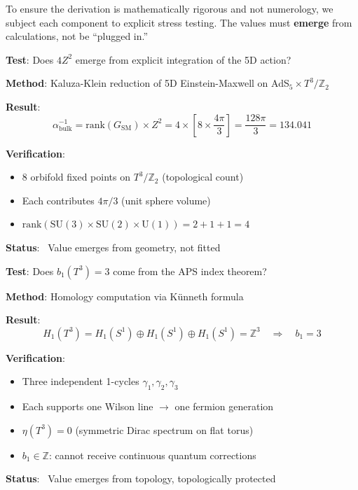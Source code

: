 \documentclass[12pt,a4paper]{article}
\newcommand{\Ztwo}{\mathbb{Z}_2}
\newcommand{\Tthree}{T^3}
\newcommand{\Zsq}{Z^2}
\begin{document}
To ensure the derivation is mathematically rigorous and not numerology, we subject each component to explicit stress testing. The values must \textbf{emerge} from calculations, not be ``plugged in.''

\begin{tcolorbox}[colback=blue!5!white, colframe=blue!60!black, title=Audit 1: Bulk Calculus (134.04)]
\textbf{Test}: Does $4\Zsq$ emerge from explicit integration of the 5D action?

\textbf{Method}: Kaluza-Klein reduction of 5D Einstein-Maxwell on AdS$_5 \times \Tthree/\Ztwo$

\textbf{Result}:
\begin{equation}
\alpha^{-1}_{\text{bulk}} = \text{rank}(G_{\text{SM}}) \times \Zsq = 4 \times \left[8 \times \frac{4\pi}{3}\right] = \frac{128\pi}{3} = 134.041
\end{equation}

\textbf{Verification}:
\begin{itemize}[itemsep=0pt]
    \item 8 orbifold fixed points on $\Tthree/\Ztwo$ (topological count)
    \item Each contributes $4\pi/3$ (unit sphere volume)
    \item $\text{rank}(\text{SU}(3) \times \text{SU}(2) \times \text{U}(1)) = 2 + 1 + 1 = 4$
\end{itemize}
\textbf{Status}: \checkmark\ Value emerges from geometry, not fitted
\end{tcolorbox}

\begin{tcolorbox}[colback=blue!5!white, colframe=blue!60!black, title=Audit 2: Topological Boundary (+3)]
\textbf{Test}: Does $b_1(\Tthree) = 3$ come from the APS index theorem?

\textbf{Method}: Homology computation via K\"unneth formula

\textbf{Result}:
\begin{equation}
H_1(\Tthree) = H_1(S^1) \oplus H_1(S^1) \oplus H_1(S^1) = \mathbb{Z}^3 \quad \Rightarrow \quad b_1 = 3
\end{equation}

\textbf{Verification}:
\begin{itemize}[itemsep=0pt]
    \item Three independent 1-cycles $\gamma_1, \gamma_2, \gamma_3$
    \item Each supports one Wilson line $\to$ one fermion generation
    \item $\eta(\Tthree) = 0$ (symmetric Dirac spectrum on flat torus)
    \item $b_1 \in \mathbb{Z}$: cannot receive continuous quantum corrections
\end{itemize}
\textbf{Status}: \checkmark\ Value emerges from topology, topologically protected
\end{tcolorbox}
\end{document}
